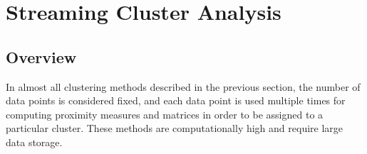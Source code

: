 






\section{Streaming Cluster Analysis }


\subsection{Overview}

In almost all clustering methods described in the previous section, the number of data points is considered fixed, and each data point is used multiple times for computing proximity measures and matrices in order to be assigned to a particular cluster. These methods are computationally high and require large data storage.

